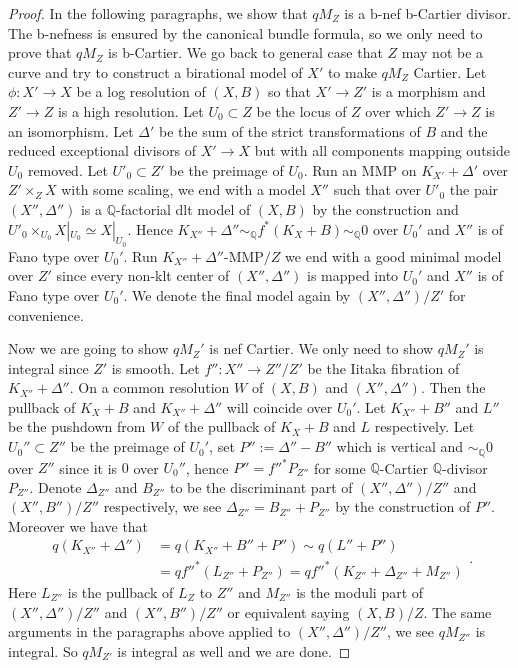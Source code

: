 \documentclass[letterpaper,reqno,12pt]{amsart}
\numberwithin{equation}{section}
\theoremstyle{plain}
\begin{document}
\begin{proof}
    In the following paragraphs, we show that $qM_Z$  is  a b-nef b-Cartier divisor. The b-nefness is ensured by the canonical bundle formula, so we only need to prove that $qM_Z$ is b-Cartier. We go back to general case that $Z$ may not be a curve and try to construct a birational model of $X'$ to make $qM_Z$ Cartier. Let $\phi:X'\to X$ be a log resolution of $(X,B)$ so that $X'\to Z'$ is a morphism and $Z'\to Z$ is a high resolution. Let $U_0\subset Z$ be the locus of $Z$ over which $Z'\to Z$ is an isomorphism.   Let $\Delta'$ be the sum of the strict transformations of $B$ and the reduced exceptional divisors of $X'\to X$ but with all components mapping outside $U_0$ removed. Let $U'_0\subset Z'$ be the preimage of $U_0$. Run an MMP on $K_{X'}+\Delta'$ over $Z'\times_Z X$ with some scaling, we end with a model $X''$ such that over $U'_0$ the pair $(X'',\Delta'')$ is a ${\mathbb Q}$-factorial dlt model of $(X,B)$ by the construction and $U'_0\times_{U_0}X|_{U_0}\simeq X|_{U_0}$. Hence $K_{X''}+\Delta''\sim_{\mathbb Q} f^*(K_X+B)\sim_{\mathbb Q} 0$ over $U_0'$ and $X''$ is of Fano type over $U_0'$. Run $K_{X''}+\Delta''$-MMP$/Z$ we end with a good minimal model over $Z'$ since every non-klt center of $(X'',\Delta'')$ is mapped into $U_0'$ and $X''$ is of Fano type over $U_0'$. We denote the final model again by $(X'',\Delta'')/Z'$ for convenience.
    
    Now we are going to show $qM_Z'$ is nef Cartier. We only need to show $qM_Z'$ is integral since $Z'$ is smooth. Let $f'':X''\to Z''/Z'$ be the Iitaka fibration of $K_{X''}+\Delta''$. On a common resolution $W$ of $(X,B)$ and $(X'',\Delta'')$. Then the pullback of $K_X+B$ and $K_{X''}+\Delta''$ will coincide over $U_0'$. Let $K_{X''}+B''$ and $L''$ be the pushdown from $W$ of the pullback of $K_X+B$ and $L$ respectively.  Let $U_0''\subset Z''$ be the preimage of $U_0'$, set $P'':=\Delta''- B''$ which is vertical and $\sim _{\mathbb Q} 0$ over $Z''$ since it is $0$ over $U_0''$, hence $P''=f''^*P_{Z''}$ for some ${\mathbb Q}$-Cartier ${\mathbb Q}$-divisor $P_{Z''}$. Denote $\Delta_{Z''}$ and $B_{Z''}$ to be the discriminant part of $(X'',\Delta'')/Z''$ and $(X'',B'')/Z''$ respectively, we see $\Delta_{Z''}=B_{Z''}+P_{Z''}$ by the construction of $P''$. Moreover  we have that \[\begin{aligned}q(K_{X''}+\Delta'')&=q(K_{X''}+B''+P'')\sim q(L''+P'')\\&=qf''^*(L_{Z''}+P_{Z''})= qf''^*(K_{Z''}+\Delta_{Z''}+M_{Z''})\end{aligned}.\] Here $L_{Z''}$ is the pullback of $L_Z$ to $Z''$ and $M_{Z''}$ is the moduli part of $(X'',\Delta'')/Z''$ and $(X'',B'')/Z''$ or equivalent saying $(X,B)/Z$.  The same arguments in the paragraphs above applied to $(X'',\Delta'')/Z''$, we see $qM_{Z''}$ is integral. So $qM_{Z'}$ is integral as well and we are done. 
    \end{proof}
\end{document}
